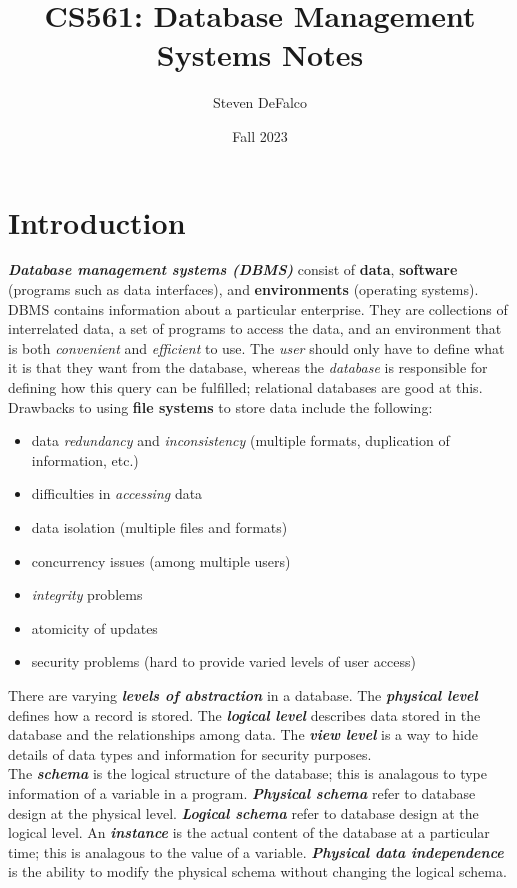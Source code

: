 \documentclass{article}
\title{CS561: Database Management Systems Notes}
\author{Steven DeFalco}
\date{Fall 2023}
\newcommand{\bold}[1]{\textbf{#1}}
\newcommand{\define}[1]{\textbf{\textit{#1}}}
\begin{document}
\maketitle
\tableofcontents
\newpage



\section{Introduction}

\define{Database management systems (DBMS)} consist of \bold{data}, \bold{software} (programs such as data interfaces), and \bold{environments} (operating systems). DBMS contains information about a particular enterprise. They are collections of interrelated data, a set of programs to access the data, and an environment that is both \emph{convenient} and \emph{efficient} to use. The \emph{user} should only have to define what it is that they want from the database, whereas the \emph{database} is responsible for defining how this query can be fulfilled; relational databases are good at this. \\

Drawbacks to using \bold{file systems} to store data include the following: 

\begin{itemize}
  \item data \emph{redundancy} and \emph{inconsistency} (multiple formats, duplication of information, etc.)
  \item difficulties in \emph{accessing} data 
  \item data isolation (multiple files and formats) 
  \item concurrency issues (among multiple users)
  \item \emph{integrity} problems 
  \item atomicity of updates
  \item security problems (hard to provide varied levels of user access)
\end{itemize}

There are varying \define{levels of abstraction} in a database. The \define{physical level} defines how a record is stored. The \define{logical level} describes data stored in the database and the relationships among data. The \define{view level} is a way to hide details of data types and information for security purposes. \\ 

The \define{schema} is the logical structure of the database; this is analagous to type information of a variable in a program. \define{Physical schema} refer to database design at the physical level. \define{Logical schema} refer to database design at the logical level. An \define{instance} is the actual content of the database at a particular time; this is analagous to the value of a variable. \define{Physical data independence} is the ability to modify the physical schema without changing the logical schema. \\ 
\end{document}
